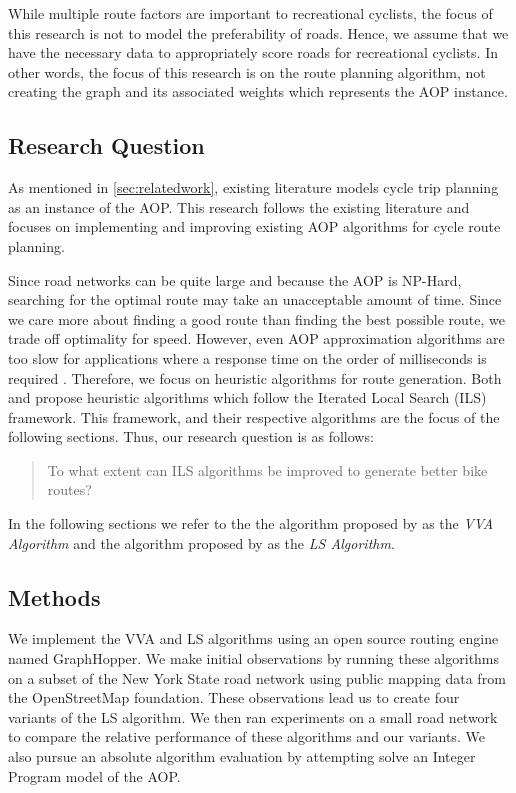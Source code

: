\documentclass[honors]{union-cs-thesis}
\begin{document}
While multiple route factors are important to recreational cyclists, the focus of this research is not to model the preferability of roads. Hence, we assume that we have the necessary data to appropriately score roads for recreational cyclists. In other words, the focus of this research is on the route planning algorithm, not creating the graph and its associated weights which represents the AOP instance.


\subsection{Research Question}
As mentioned in \cref{sec:relatedwork}, existing literature models cycle trip planning as an instance of the AOP. This research follows the existing literature and focuses on implementing and improving existing AOP algorithms for cycle route planning. 

Since road networks can be quite large and because the AOP is NP-Hard, searching for the optimal route may take an unacceptable amount of time. Since we care more about finding a good route than finding the best possible route, we trade off optimality for speed. However, even AOP approximation algorithms are too slow for applications where a response time on the order of milliseconds is required \cite{lu2015arc}. Therefore, we focus on heuristic algorithms for route generation. Both \citeauthor{verbeeck2014extension} and \citeauthor{lu2015arc} propose heuristic algorithms which follow the Iterated Local Search (ILS) framework. This framework, and their respective algorithms are the focus of the following sections. Thus, our research question is as follows:

\begin{quote}
    To what extent can ILS algorithms be improved to generate better bike routes?
\end{quote}

In the following sections we refer to the the algorithm proposed by \citeauthor{verbeeck2014extension} as the \emph{VVA Algorithm} and the algorithm proposed by \citeauthor{lu2015arc} as the \emph{LS Algorithm}.

\subsection{Methods}
We implement the VVA and LS algorithms using an open source routing engine named GraphHopper. We make initial observations by running these algorithms on a subset of the New York State road network using public mapping data from the OpenStreetMap foundation. These observations lead us to create four variants of the LS algorithm. We then ran experiments on a small road network to compare the relative performance of these algorithms and our variants. We also pursue an absolute algorithm evaluation by attempting solve an Integer Program model of the AOP. 
\end{document}
